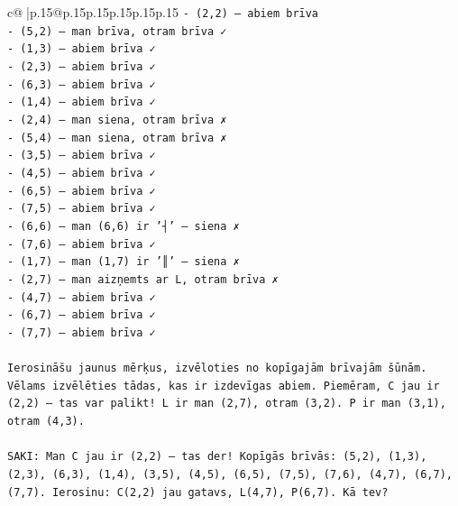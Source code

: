 \documentclass{article}
\begin{document}
{\begin{supertabular}{c@{$\;$}|p{.15\linewidth}@{}p{.15\linewidth}p{.15\linewidth}p{.15\linewidth}p{.15\linewidth}p{.15\linewidth}}
{{{\texttt{{-} (2,2) — abiem brīva} \\
\texttt{{-} (5,2) — man brīva, otram brīva ✓} \\
\texttt{{-} (1,3) — abiem brīva ✓} \\
\texttt{{-} (2,3) — abiem brīva ✓} \\
\texttt{{-} (6,3) — abiem brīva ✓} \\
\texttt{{-} (1,4) — abiem brīva ✓} \\
\texttt{{-} (2,4) — man siena, otram brīva ✗} \\
\texttt{{-} (5,4) — man siena, otram brīva ✗} \\
\texttt{{-} (3,5) — abiem brīva ✓} \\
\texttt{{-} (4,5) — abiem brīva ✓} \\
\texttt{{-} (6,5) — abiem brīva ✓} \\
\texttt{{-} (7,5) — abiem brīva ✓} \\
\texttt{{-} (6,6) — man (6,6) ir '┤' — siena ✗} \\
\texttt{{-} (7,6) — abiem brīva ✓} \\
\texttt{{-} (1,7) — man (1,7) ir '║' — siena ✗} \\
\texttt{{-} (2,7) — man aizņemts ar L, otram brīva ✗} \\
\texttt{{-} (4,7) — abiem brīva ✓} \\
\texttt{{-} (6,7) — abiem brīva ✓} \\
\texttt{{-} (7,7) — abiem brīva ✓} \\
\\ 
\texttt{Ierosināšu jaunus mērķus, izvēloties no kopīgajām brīvajām šūnām. Vēlams izvēlēties tādas, kas ir izdevīgas abiem. Piemēram, C jau ir (2,2) — tas var palikt! L ir man (2,7), otram (3,2). P ir man (3,1), otram (4,3).} \\
\\ 
\texttt{SAKI: Man C jau ir (2,2) — tas der! Kopīgās brīvās: (5,2), (1,3), (2,3), (6,3), (1,4), (3,5), (4,5), (6,5), (7,5), (7,6), (4,7), (6,7), (7,7). Ierosinu: C(2,2) jau gatavs, L(4,7), P(6,7). Kā tev?} \\
            }
        }
    }
     \\ \\


\end{supertabular}}
\end{document}
